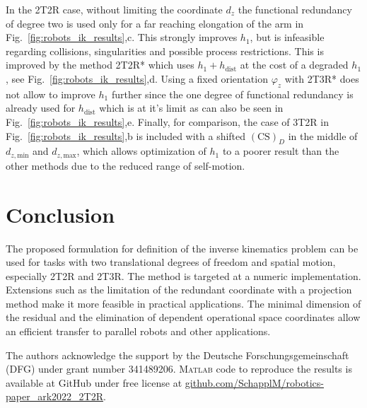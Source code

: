 \documentclass[graybox,vecphys]{svmult}
\newcommand{\ks}[1]{{(\mathrm{CS})_{#1}}}
\begin{document}
In the 2T2R case, without limiting the coordinate $d_z$
the functional redundancy of degree two is used only for a far reaching elongation of the arm in Fig.~\ref{fig:robots_ik_results},c.
This strongly improves $h_1$, but is infeasible regarding collisions, singularities and possible process restrictions.
This is improved by the method 2T2R* which uses $h_1+h_\mathrm{dist}$ at the cost of a degraded $h_1$, see Fig.~\ref{fig:robots_ik_results},d.
Using a fixed orientation $\varphi_z$ with 2T3R* does not allow to improve $h_1$ further since the one degree of functional redundancy is already used for $h_\mathrm{dist}$ which is at it's limit as can also be seen in Fig.~\ref{fig:robots_ik_results},e.
Finally, for comparison, the case of 3T2R in Fig.~\ref{fig:robots_ik_results},b is included with a shifted $\ks{D}$ in the middle of $d_{z,\mathrm{min}}$ and $d_{z,\mathrm{max}}$, which allows optimization of $h_1$ to a poorer result than the other methods due to the reduced range of self-motion.

\section{Conclusion}
\label{sec:conclusion}

The proposed formulation for definition of the inverse kinematics problem can be used for tasks with two translational degrees of freedom and spatial motion, especially 2T2R and 2T3R.
The method is targeted at a numeric implementation.
Extensions such as the limitation of the redundant coordinate with a projection method make it more feasible in practical applications.
The minimal dimension of the residual and the elimination of dependent operational space coordinates allow an efficient transfer to parallel robots and other applications.


\begin{acknowledgement}
The authors acknowledge the support by the Deutsche Forschungsgemeinschaft (DFG) under grant number 341489206. \textsc{Matlab} code to reproduce the results
is available at GitHub under free license at \url{github.com/SchapplM/robotics-paper_ark2022_2T2R}.
\end{acknowledgement}



\end{document}
